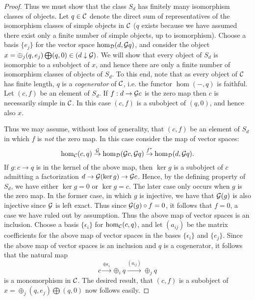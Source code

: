 \documentclass{amsart}
\begin{document}
\begin{proof}
Thus we must show that the class $S_d$ has finitely many isomorphism classes of objects. Let $q \in \mathcal C$ denote the direct sum of representatives of the isomorphism classes of simple objects in $\mathcal C$ ($q$ exists because we have assumed there exist only a finite number of simple objects, up to isomorphism). Choose a basis $\{e_j\}$ for the vector space $\hom_{\mathcal D}(d, \mathcal G q)$, and consider the object $x = \oplus_j( q, e_j) \bigoplus (q,0) \in (d \downarrow \mathcal G)$. We will show that every object of $S_d$ is isomorphic to a subobject of $x$, and hence there are only a finite number of isomorphism classes of objects of $S_d$. To this end, note that as every object of $\mathcal C$ has finite length, $q$ is a {\em cogenerator} of $\mathcal C$, i.e. the functor $\hom(-, q)$ is faithful. Let $(c, f)$ be an element of $S_d$. If $f: d \to \mathcal G c$ is the zero map then $c$ is necessarily simple in $\mathcal C$. In this case $(c, f)$ is a subobject of $(q, 0)$, and hence also $x$. 

Thus we may assume, without loss of generality, that  $(c, f)$ be an element of $S_d$ in which $f$ is {\em not} the zero map. In this case consider the map of vector spaces:
\begin{equation*}
	\hom_{\mathcal C}(c,q) \stackrel{\mathcal G}{\to} \hom_{\mathcal D}(\mathcal G c, \mathcal G q) \stackrel{f^*}{\to} \hom_{\mathcal D}(d, \mathcal G q).
\end{equation*} 
If $g: c \to q$ is in the kernel of the above map, then $\ker g$ is a subobject of $c$ admitting a factorization $d \to \mathcal G(\ker g) \to \mathcal G c$. Hence, by the defining property of $S_d$, we have either $\ker g = 0$ or $\ker g = c$. The later case only occurs when $g$ is the zero map. In the former case, in which $g$ is injective, we have that $\mathcal G(g)$ is also injective since $\mathcal G$ is left exact. Thus since $\mathcal G(g) \circ f = 0$, it follows that $f = 0$, a case we have ruled out by assumption. Thus the above map of vector spaces is an inclusion. Choose a basis  $\{ \epsilon_i \}$ for $\hom_{\mathcal C}(c,q)$, and let $(a_{ij})$ be the matrix coefficients for the above map of vector spaces in the bases $\{ \epsilon_i \}$ and $\{ e_j \}$. Since the above map of vector spaces is an inclusion and $q$ is a cogenerator, it follows that the natural map
\begin{equation*}
	c \stackrel{\oplus \epsilon_i}{\to} \oplus_i q \stackrel{(a_{ij}) }{\to} \oplus_j q
\end{equation*} 
is a monomorphism in $\mathcal C$. The desired result, that $(c,f)$ is a subobject of $x = \oplus_j( q, e_j) \bigoplus (q,0)$ now follows easily. 
\end{proof}
\end{document}
